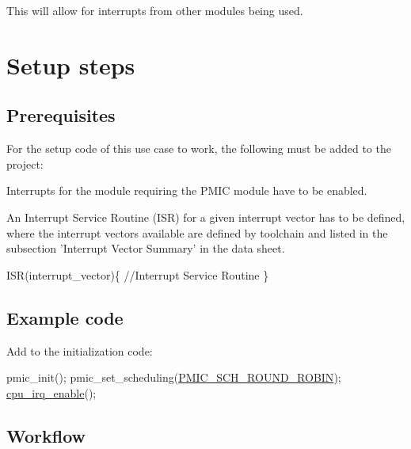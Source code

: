This will allow for interrupts from other modules being used.\hypertarget{xmega_pmic_quickstart_pmic_basic_use_case_setup}{}\section{Setup steps}\label{xmega_pmic_quickstart_pmic_basic_use_case_setup}
\hypertarget{pmic_use_case_1_pmic_basic_use_case_setup_prereq}{}\subsection{Prerequisites}\label{pmic_use_case_1_pmic_basic_use_case_setup_prereq}
For the setup code of this use case to work, the following must be added to the project\-:
\begin{DoxyEnumerate}
\item Interrupts for the module requiring the P\-M\-I\-C module have to be enabled.
\item An Interrupt Service Routine (I\-S\-R) for a given interrupt vector has to be defined, where the interrupt vectors available are defined by toolchain and listed in the subsection 'Interrupt Vector Summary' in the data sheet. 
\begin{DoxyCode}
        ISR(interrupt\_vector)\{
            \textcolor{comment}{//Interrupt Service Routine}
        \}
\end{DoxyCode}

\end{DoxyEnumerate}\hypertarget{xmega_pmic_quickstart_pmic_basic_use_case_setup_code}{}\subsection{Example code}\label{xmega_pmic_quickstart_pmic_basic_use_case_setup_code}
Add to the initialization code\-: 
\begin{DoxyCode}
        pmic\_init();
        pmic\_set\_scheduling(\hyperlink{group__pmic__group_gga68099717e4fa4e95f12943d3e3e55d79a29065590de0ddf49e19afb6de1646c79}{PMIC\_SCH\_ROUND\_ROBIN});
        \hyperlink{group__interrupt__group_gae4922a4bd8ba4150211fbc7f2302403c}{cpu\_irq\_enable}();
\end{DoxyCode}
\hypertarget{xmega_pmic_quickstart_pmic_basic_use_case_setup_flow}{}\subsection{Workflow}\label{xmega_pmic_quickstart_pmic_basic_use_case_setup_flow}

